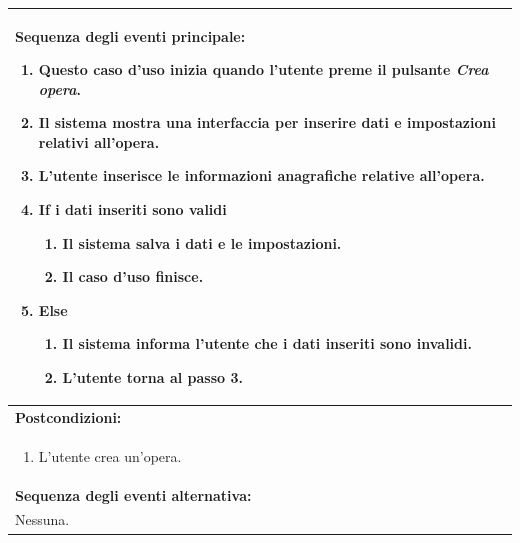 \documentclass{article}
\begin{document}
\begin{table}[H]
\begin{tabular}{|p{\linewidth}|}
                        \hline
                        \textbf{Sequenza degli eventi principale:}
                        \begin{enumerate}
                            \item Questo caso d'uso inizia quando l'utente preme il pulsante \emph{Crea opera}.
                            \item Il sistema mostra una interfaccia per inserire dati e impostazioni relativi all'opera. %
                            \item L'utente inserisce le informazioni anagrafiche relative all'opera.
                            \item \textbf{If} i dati inseriti sono validi
                            \begin{enumerate}
                                \item Il sistema salva i dati e le impostazioni.
                                \item Il caso d'uso finisce.
                            \end{enumerate}
                            \item \textbf{Else}
                            \begin{enumerate}
                                \item Il sistema informa l'utente che i dati inseriti sono invalidi.
                                \item L'utente torna al passo 3.
                            \end{enumerate}
                        \end{enumerate} \\
                        \hline
                        \cellcolor{gray!20}
                        \textbf{Postcondizioni:} \\
                        \cellcolor{gray!20}
                        \begin{minipage}{\linewidth}
                            \begin{enumerate}
                                \item L'utente crea un'opera.
                            \end{enumerate}
                        \end{minipage}
                        \vspace{-10pt} \\
                        \hline
                        \textbf{Sequenza degli eventi alternativa:} \\
                        Nessuna. \\
                        \hline
                    \end{tabular}
                \end{table}
\end{document}
